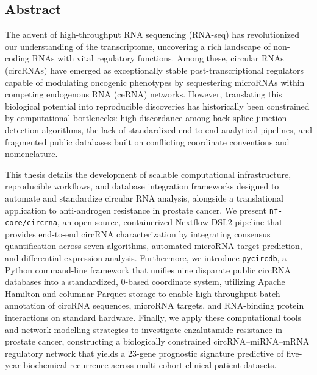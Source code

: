 \begin{center}
    \vspace*{1.5cm}
    \section*{Abstract}
    \vspace{0.5cm}
\end{center}

\justifying
\normalsize
The advent of high-throughput RNA sequencing (RNA-seq) has revolutionized our understanding of the transcriptome, uncovering a rich landscape of non-coding RNAs with vital regulatory functions. Among these, circular RNAs (circRNAs) have emerged as exceptionally stable post-transcriptional regulators capable of modulating oncogenic phenotypes by sequestering microRNAs within competing endogenous RNA (ceRNA) networks. However, translating this biological potential into reproducible discoveries has historically been constrained by computational bottlenecks: high discordance among back-splice junction detection algorithms, the lack of standardized end-to-end analytical pipelines, and fragmented public databases built on conflicting coordinate conventions and nomenclature. 

This thesis details the development of scalable computational infrastructure, reproducible workflows, and database integration frameworks designed to automate and standardize circular RNA analysis, alongside a translational application to anti-androgen resistance in prostate cancer. We present \texttt{nf-core/circrna}, an open-source, containerized Nextflow DSL2 pipeline that provides end-to-end circRNA characterization by integrating consensus quantification across seven algorithms, automated microRNA target prediction, and differential expression analysis. Furthermore, we introduce \texttt{pycircdb}, a Python command-line framework that unifies nine disparate public circRNA databases into a standardized, 0-based coordinate system, utilizing Apache Hamilton and columnar Parquet storage to enable high-throughput batch annotation of circRNA sequences, microRNA targets, and RNA-binding protein interactions on standard hardware. Finally, we apply these computational tools and network-modelling strategies to investigate enzalutamide resistance in prostate cancer, constructing a biologically constrained circRNA--miRNA--mRNA regulatory network that yields a 23-gene prognostic signature predictive of five-year biochemical recurrence across multi-cohort clinical patient datasets.

\newpage